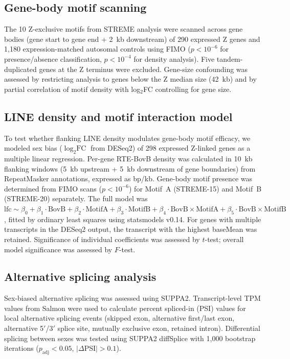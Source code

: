 \documentclass[12pt]{article}
\begin{document}
\subsection*{Gene-body motif scanning}

The 10 Z-exclusive motifs from STREME analysis
were scanned across gene bodies (gene start to gene end + 2~kb downstream)
of 290 expressed Z genes and 1,180 expression-matched autosomal controls
using FIMO ($p < 10^{-6}$ for presence/absence classification,
$p < 10^{-4}$ for density analysis).
Five tandem-duplicated genes at the Z terminus were excluded.
Gene-size confounding was assessed by restricting analysis
to genes below the Z median size (42~kb)
and by partial correlation of motif density with log$_2$FC controlling for gene size.

\subsection*{LINE density and motif interaction model}

To test whether flanking LINE density modulates gene-body motif efficacy,
we modeled sex bias ($\log_2\text{FC}$ from DESeq2)
of 298 expressed Z-linked genes as a multiple linear regression.
Per-gene RTE-BovB density was calculated in 10~kb flanking windows
(5~kb upstream + 5~kb downstream of gene boundaries)
from RepeatMasker annotations, expressed as bp/kb.
Gene-body motif presence was determined from FIMO scans
($p < 10^{-6}$) for Motif~A (STREME-15) and Motif~B (STREME-20) separately.
The full model was $\text{lfc} \sim \beta_0 + \beta_1 \cdot \text{BovB}
+ \beta_2 \cdot \text{MotifA} + \beta_3 \cdot \text{MotifB}
+ \beta_4 \cdot \text{BovB} \times \text{MotifA}
+ \beta_5 \cdot \text{BovB} \times \text{MotifB}$,
fitted by ordinary least squares using statsmodels v0.14.
For genes with multiple transcripts in the DESeq2 output,
the transcript with the highest baseMean was retained.
Significance of individual coefficients was assessed by $t$-test;
overall model significance was assessed by $F$-test.

\subsection*{Alternative splicing analysis}

Sex-biased alternative splicing was assessed using SUPPA2.
Transcript-level TPM values from Salmon were used to calculate
percent spliced-in (PSI) values for local alternative splicing events
(skipped exon, alternative first/last exon, alternative 5$'$/3$'$ splice site,
mutually exclusive exon, retained intron).
Differential splicing between sexes was tested using SUPPA2 diffSplice
with 1,000 bootstrap iterations ($p_\text{adj} < 0.05$, $|\Delta\text{PSI}| > 0.1$).
\end{document}
